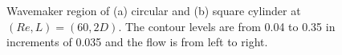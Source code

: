 \begin{figure}
\centering 
\begin{subfigure}{0.495\textwidth}
\centering
    \caption{}
    \label{fig:wavemaker_circle}
    \end{subfigure} 
\begin{subfigure}{0.495\textwidth}
\centering
    \caption{}
    \label{fig:wavemaker_square}
    \end{subfigure} 
  \caption{Wavemaker region of (a) circular and (b) square cylinder at $(Re,L)=(60,2D)$.
  The contour levels are from 0.04 to 0.35 in increments of 0.035 and the flow is from left to right. }
\label{fig:wavemaker}  
\end{figure}




